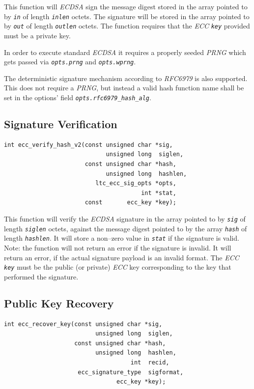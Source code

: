\documentclass[synpaper]{book}
\newcommand{\code}[1]{\texttt{\textit{#1}}}
\begin{document}
This function will \textit{ECDSA} sign the message digest stored in the array pointed to by \code{in} of length \code{inlen} octets.  The signature
will be stored in the array pointed to by \code{out} of length \code{outlen} octets.  The function requires that the \textit{ECC}
\code{key} provided must be a private key.

In order to execute standard \textit{ECDSA} it requires a properly seeded \textit{PRNG} which gets passed via \code{opts.prng} and \code{opts.wprng}.

The deterministic signature mechanism according to \textit{RFC6979} is also supported. This does not require a \textit{PRNG}, but
instead a valid hash function name shall be set in the options' field \code{opts.rfc6979\_hash\_alg}.

\subsection{Signature Verification}
\label{ecc-verify}
\begin{verbatim}
int ecc_verify_hash_v2(const unsigned char *sig,
                             unsigned long  siglen,
                       const unsigned char *hash,
                             unsigned long  hashlen,
                          ltc_ecc_sig_opts *opts,
                                       int *stat,
                       const       ecc_key *key);
\end{verbatim}

This function will verify the \textit{ECDSA} signature in the array pointed to by \code{sig} of length \code{siglen} octets, against the message digest
pointed to by the array \code{hash} of length \code{hashlen}. It will store a non--zero value in \code{stat} if the signature is valid.  Note:
the function will not return an error if the signature is invalid. It will return an error, if the actual signature payload is an invalid format.
The \textit{ECC} \code{key} must be the public (or private) \textit{ECC} key corresponding to the key that performed the signature.

\subsection{Public Key Recovery}
\begin{verbatim}
int ecc_recover_key(const unsigned char *sig,
                          unsigned long  siglen,
                    const unsigned char *hash,
                          unsigned long  hashlen,
                                    int  recid,
                     ecc_signature_type  sigformat,
                                ecc_key *key);
\end{verbatim}
\end{document}
